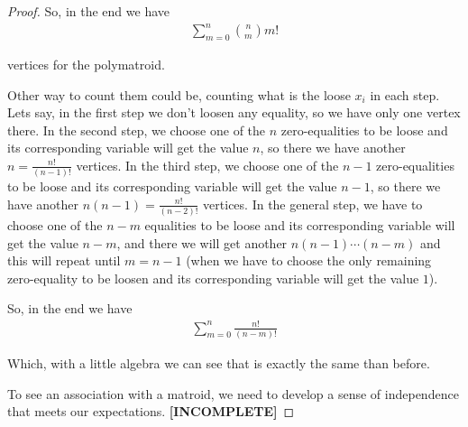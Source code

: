 \begin{proof}
        So, in the end we have
        \begin{align}
                \sum_{m = 0}^n \binom{n}{m} m!
        \end{align}
        
        vertices for the polymatroid.\pn
        
        Other way to count them could be, counting what is the loose $x_i$ in each step. Lets say, in the first step we don't loosen any equality, so 
        we have only one vertex there. In the second step, we choose one of the $n$ zero-equalities to be loose and its corresponding variable will get the value $n$, 
        so there we have another $n = \frac{n!}{(n-1)!}$ vertices. In the third step, we choose one of the $n-1$ zero-equalities to be loose and its corresponding
        variable will get the value $n-1$, so there we have another $n (n-1) = \frac{n!}{(n-2)!}$ vertices. In the general step, we have to choose one of the $n-m$ 
        equalities to be loose and its corresponding variable will get the value $n-m$, and there we will get another $n (n-1) \cdots (n-m)$ and this will repeat 
        until $m = n-1$ (when we have to choose the only remaining zero-equality to be loosen and its corresponding variable will get the value $1$).\pn
        
        So, in the end we have
        \begin{align}
                \sum_{m = 0}^{n} \frac{n!}{(n-m)!}
        \end{align}
        
        Which, with a little algebra we can see that is exactly the same than before.\pn
        
        To see an association with a matroid, we need to develop a sense of independence that meets our expectations.
        \textbf{[INCOMPLETE]}
    \end{proof}
